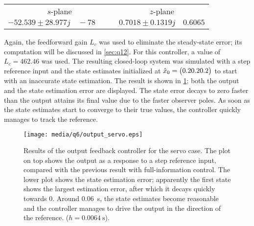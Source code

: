 \begin{center}
    \begin{tabular}{cc}
        $s$-plane & $z$-plane\\
        $-52.539 \pm28.977j \quad -78\qquad$  & $ 0.7018 \pm 0.1319j\quad0.6065$ \\
    \end{tabular}
\end{center}
Again, the feedforward gain $L_c$ was used to eliminate the steady-state error; its computation will be discussed in \cref{sec:q12}. For this controller, a value of $L_c = 462.46$ was used. The resulting closed-loop system was simulated with a step reference input and the state estimates initialized at $\hat{x}_0 = \mqty(0.2 0.2 0.2)$ to start with an inaccurate state estimation. The result is shown in \cref{fig:q6_output_servo}; both the output and the state estimation error are displayed. The state error decays to zero faster than the output attains its final value due to the faster observer poles. As soon as the state estimates start to converge to their true values, the controller quickly manages to track the reference.
\begin{figure}[ht!]
    \centering
    \texttt{[image: media/q6/output\_servo.eps]}
    \caption{Results of the output feedback controller for the servo case. The plot on top shows the output as a response to a step reference input, compared with the previous result with full-information control. The lower plot shows the state estimation error; apparently the first state shows the largest estimation error, after which it decays quickly towards 0. Around \SI{0.06}{\second}, the state estimates become reasonable and the controller manages to drive the output in the direction of the reference. ($h = \SI{0.0064}{\second}$). }
    \label{fig:q6_output_servo}
\end{figure}
\FloatBarrier

